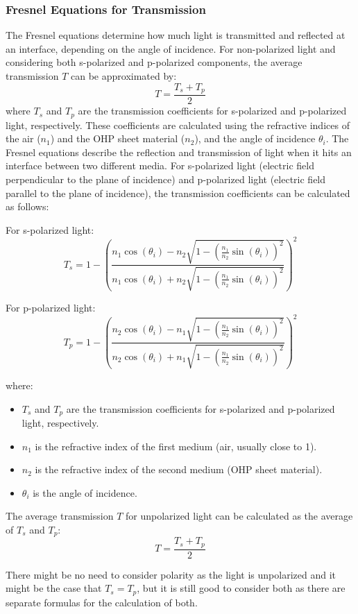 \subsubsection*{Fresnel Equations for Transmission}
The Fresnel equations \citep{eschede2017optics} determine how much light is transmitted and reflected at an interface, depending on the angle of incidence. For non-polarized light and considering both s-polarized and p-polarized components, the average transmission \(T\) can be approximated by:
\[ T = \frac{T_s + T_p}{2} \]
where \(T_s\) and \(T_p\) are the transmission coefficients for s-polarized and p-polarized light, respectively. These coefficients are calculated using the refractive indices of the air (\(n_1\)) and the OHP sheet material (\(n_2\)), and the angle of incidence \(\theta_i\).
The Fresnel equations describe the reflection and transmission of light when it hits an interface between two different media. For s-polarized light (electric field perpendicular to the plane of incidence) and p-polarized light (electric field parallel to the plane of incidence), the transmission coefficients can be calculated as follows:

For s-polarized light:
\[ T_s = 1 - \left( \frac{n_1 \cos(\theta_i) - n_2 \sqrt{1 - \left(\frac{n_1}{n_2} \sin(\theta_i)\right)^2}}{n_1 \cos(\theta_i) + n_2 \sqrt{1 - \left(\frac{n_1}{n_2} \sin(\theta_i)\right)^2}} \right)^2 \]

For p-polarized light:
\[ T_p = 1 - \left( \frac{n_2 \cos(\theta_i) - n_1 \sqrt{1 - \left(\frac{n_1}{n_2} \sin(\theta_i)\right)^2}}{n_2 \cos(\theta_i) + n_1 \sqrt{1 - \left(\frac{n_1}{n_2} \sin(\theta_i)\right)^2}} \right)^2 \]

where:
\begin{itemize}
    \item \( T_s \) and \( T_p \) are the transmission coefficients for s-polarized and p-polarized light, respectively.
    \item \( n_1 \) is the refractive index of the first medium (air, usually close to 1).
    \item \( n_2 \) is the refractive index of the second medium (OHP sheet material).
    \item \( \theta_i \) is the angle of incidence.
\end{itemize}

The average transmission \( T \) for unpolarized light can be calculated as the average of \( T_s \) and \( T_p \):
\[ T = \frac{T_s + T_p}{2} \]

There might be no need to consider polarity as the light is unpolarized and it might be the case that \(T_s = T_p\), but it is still good to consider both 
as there are separate formulas for the calculation of both.


